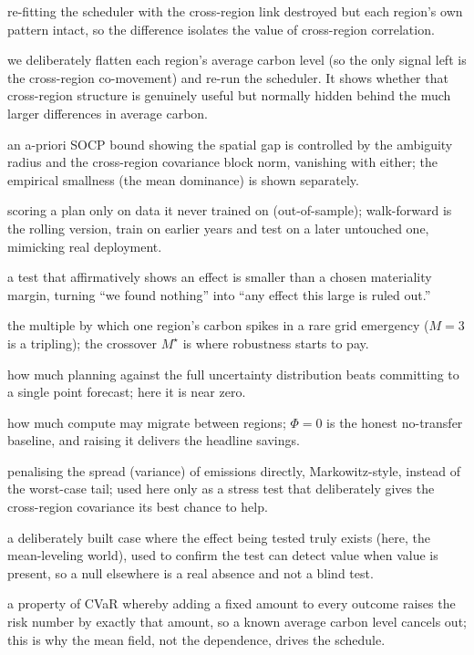 \documentclass[12pt]{article}
\begin{document}
\begin{description}[leftmargin=1.4em,itemsep=1pt]
\item[Shuffled-marginals test:] re-fitting the scheduler with the cross-region link
destroyed but each region's own pattern intact, so the difference isolates the value of
cross-region correlation.
\item[Mean-leveling test:] we deliberately flatten each region's average carbon level (so the only signal left is the cross-region co-movement) and re-run the scheduler. It shows whether that cross-region structure is genuinely useful but normally hidden behind the much larger differences in average carbon.
\item[Mean-dominance (Proposition~\ref{prop:meandom}):] an a-priori SOCP bound showing the
spatial gap is controlled by the ambiguity radius and the cross-region covariance block norm,
vanishing with either; the empirical smallness (the mean dominance) is shown separately.
\item[Out-of-sample / walk-forward:] scoring a plan only on data it never trained on (out-of-sample); walk-forward is the rolling version, train on earlier years and test on a later untouched one, mimicking real deployment.
\item[Equivalence test (TOST):] a test that affirmatively shows an effect is smaller than a chosen materiality margin, turning ``we found nothing'' into ``any effect this large is ruled out.''
\item[Severity $M$:] the multiple by which one region's carbon spikes in a rare grid emergency ($M=3$ is a tripling); the crossover $M^\star$ is where robustness starts to pay.
\item[Value of the stochastic solution (VSS):] how much planning against the full uncertainty distribution beats committing to a single point forecast; here it is near zero.
\item[Transfer budget ($\Phi$):] how much compute may migrate between regions; $\Phi=0$ is the honest no-transfer baseline, and raising it delivers the headline savings.
\item[Mean-variance objective:] penalising the spread (variance) of emissions directly, Markowitz-style, instead of the worst-case tail; used here only as a stress test that deliberately gives the cross-region covariance its best chance to help.
\item[Positive control:] a deliberately built case where the effect being tested truly exists (here, the mean-leveling world), used to confirm the test can detect value when value is present, so a null elsewhere is a real absence and not a blind test.
\item[Translation invariance:] a property of CVaR whereby adding a fixed amount to every outcome raises the risk number by exactly that amount, so a known average carbon level cancels out; this is why the mean field, not the dependence, drives the schedule.
\end{description}
\end{document}
